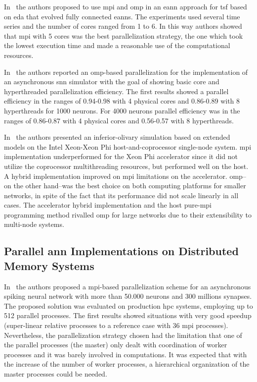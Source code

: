 \documentclass[10pt,journal,compsoc]{IEEEtran}
\begin{document}
In~\cite{6232827} the authors proposed to use \gls{mpi} and \gls{omp} in an \gls{eann} approach for \gls{tsf} based on \gls{eda} that evolved fully connected \glspl{eann}. The experiments used several time series and the number of cores ranged from 1 to 6. In this way authors showed that \gls{mpi} with 5 cores was the best parallelization strategy, the one which took the lowest execution time and made a reasonable use of the computational resources.

In~\cite{6511739} the authors reported an \gls{omp}-based parallelization for the implementation of an asynchronous \gls{snn} simulator with the goal of showing basic core and hyperthreaded parallelization efficiency. The first results showed a parallel efficiency in the ranges of 0.94-0.98 with 4 physical cores and 0.86-0.89 with 8 hyperthreads for 1000 neurons. For 4000 neurons parallel efficiency was in the ranges of 0.86-0.87 with 4 physical cores and 0.56-0.57 with 8 hyperthreads.

In~\cite{Chatzikonstantis:2016:FID:2903150.2903477} the authors presented an inferior-olivary simulation based on extended  models on the Intel Xeon-Xeon Phi host-and-coprocessor single-node system. \gls{mpi} implementation underperformed for the Xeon Phi accelerator since it did not utilize the coprocessor multithreading resources, but performed well on the host. A hybrid implementation improved on \gls{mpi} limitations on the accelerator. \gls{omp}--on the other hand--was the best choice on both computing platforms for smaller networks, in spite of the fact that its performance did not scale linearly in all cases. The accelerator hybrid implementation and the host pure-\gls{mpi} programming method rivalled \gls{omp} for large networks due to their extensibility to multi-node systems.












\subsection{Parallel \gls{ann} Implementations on Distributed Memory Systems}

In~\cite{6821186} the authors proposed a \gls{mpi}-based parallelization scheme for an asynchronous spiking neural network with more than 50.000 neurons and 300 millions synapses. The proposed solution was evaluated on production \gls{hpc} systems, employing up to 512 parallel processes. The first results showed situations with very good speedup (super-linear relative processes to a reference case with 36 \gls{mpi} processes). Nevertheless, the parallelization strategy chosen had the limitation that one of the parallel processes (the master) only dealt with coordination of worker processes and it was barely involved in computations. It was expected that with the increase of the number of worker processes, a hierarchical organization of the master processes could be needed.
\end{document}
